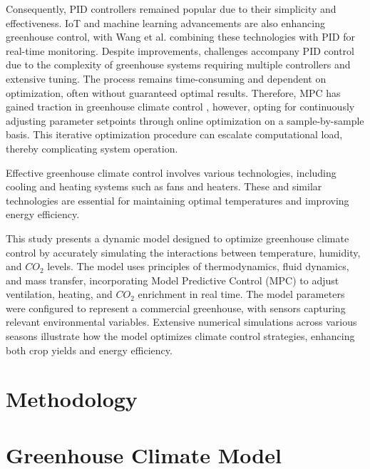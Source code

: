 \documentclass[conference]{IEEEtran}
\begin{document}
Consequently, PID controllers remained popular due to their simplicity and effectiveness. IoT and machine learning advancements are also enhancing greenhouse control, with Wang et al. \cite{Wang2024} combining these technologies with PID for real-time monitoring. Despite improvements, challenges accompany PID control due to the complexity of greenhouse systems requiring multiple controllers and extensive tuning. The process remains time-consuming and dependent on optimization, often without guaranteed optimal results. Therefore, MPC has gained traction in greenhouse climate control \cite{Hu2022}, however, opting for continuously adjusting parameter setpoints through online optimization on a sample-by-sample basis. This iterative optimization procedure can escalate computational load, thereby complicating system operation. 



Effective greenhouse climate control involves various technologies, including cooling and heating systems such as fans and heaters. These and similar technologies are essential for maintaining optimal temperatures and improving energy efficiency.

This study presents a dynamic model designed to optimize greenhouse climate control by accurately simulating the interactions between temperature, humidity, and $CO_2$ levels. The model uses principles of thermodynamics, fluid dynamics, and mass transfer, incorporating Model Predictive Control (MPC) to adjust ventilation, heating, and $CO_2$ enrichment in real time. The model parameters were configured to represent a commercial greenhouse, with sensors capturing relevant environmental variables. Extensive numerical simulations across various seasons illustrate how the model optimizes climate control strategies, enhancing both crop yields and energy efficiency.


\section{Methodology}

\section{Greenhouse Climate Model}
\end{document}
